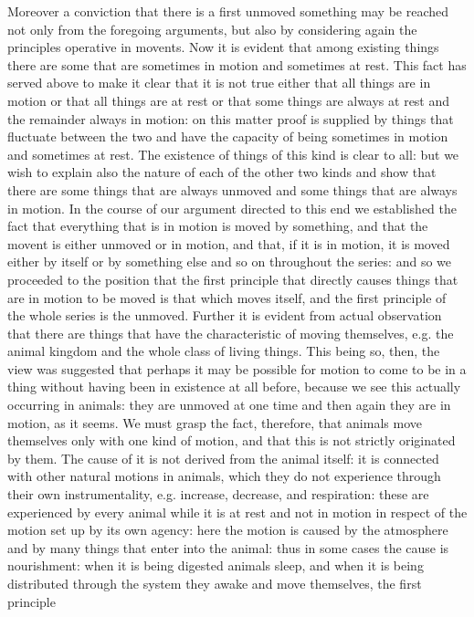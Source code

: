 Moreover a conviction that there is a first unmoved something may
be reached not only from the foregoing arguments, but also by considering
again the principles operative in movents. Now it is evident that
among existing things there are some that are sometimes in motion
and sometimes at rest. This fact has served above to make it clear
that it is not true either that all things are in motion or that all
things are at rest or that some things are always at rest and the
remainder always in motion: on this matter proof is supplied by things
that fluctuate between the two and have the capacity of being sometimes
in motion and sometimes at rest. The existence of things of this kind
is clear to all: but we wish to explain also the nature of each of
the other two kinds and show that there are some things that are always
unmoved and some things that are always in motion. In the course of
our argument directed to this end we established the fact that everything
that is in motion is moved by something, and that the movent is either
unmoved or in motion, and that, if it is in motion, it is moved either
by itself or by something else and so on throughout the series: and
so we proceeded to the position that the first principle that directly
causes things that are in motion to be moved is that which moves itself,
and the first principle of the whole series is the unmoved. Further
it is evident from actual observation that there are things that have
the characteristic of moving themselves, e.g. the animal kingdom and
the whole class of living things. This being so, then, the view was
suggested that perhaps it may be possible for motion to come to be
in a thing without having been in existence at all before, because
we see this actually occurring in animals: they are unmoved at one
time and then again they are in motion, as it seems. We must grasp
the fact, therefore, that animals move themselves only with one kind
of motion, and that this is not strictly originated by them. The cause
of it is not derived from the animal itself: it is connected with
other natural motions in animals, which they do not experience through
their own instrumentality, e.g. increase, decrease, and respiration:
these are experienced by every animal while it is at rest and not
in motion in respect of the motion set up by its own agency: here
the motion is caused by the atmosphere and by many things that enter
into the animal: thus in some cases the cause is nourishment: when
it is being digested animals sleep, and when it is being distributed
through the system they awake and move themselves, the first principle
